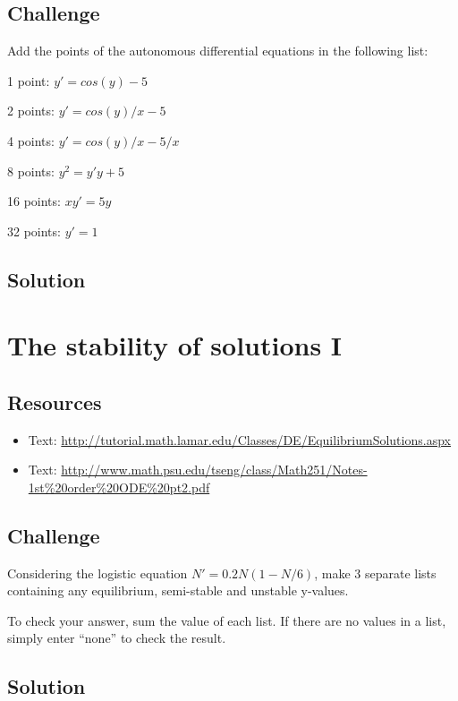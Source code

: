 \subsection*{Challenge}
Add the points of the autonomous differential equations in the following list:

1 point: $y' = cos(y)-5$

2 points: $y' = cos(y)/x - 5$

4 points: $y' = cos(y)/x - 5/x$

8 points: $y^2 = y' y+5$

16 points: $x y' = 5 y$

32 points: $y' = 1$

\subsection*{Solution}
\six{}

\timebox




\newpage
\section{The stability of solutions I}

\subsection*{Resources}
\begin{itemize}
    \item Text: \url{http://tutorial.math.lamar.edu/Classes/DE/EquilibriumSolutions.aspx}
    \item Text: \url{http://www.math.psu.edu/tseng/class/Math251/Notes-1st\%20order\%20ODE\%20pt2.pdf}
\end{itemize}

\subsection*{Challenge}
Considering the logistic equation $N'=0.2N(1-N/6)$, make 3 separate lists containing any equilibrium, semi-stable and unstable y-values.

To check your answer, sum the value of each list. If there are no values in a list, simply enter ``none'' to check the result.

\subsection*{Solution}
